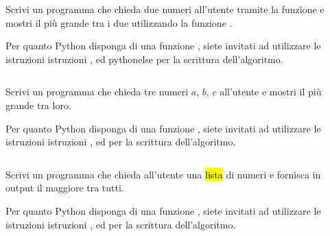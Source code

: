 \documentclass[a4paper,11pt,addpoints]{exam}
\begin{document}
\begin{questions}
    \question[3]  Scrivi un programma che chieda due numeri all'utente tramite la
    funzione  e mostri il più grande tra i due utilizzando la funzione .

    \begin{important}
        \item Per quanto Python disponga di una funzione , siete invitati ad utilizzare
        le istruzioni istruzioni ,  ed python{else} per la scrittura dell'algoritmo.
    \end{important}

    \begin{solution}
        \small\inputminted{python}{solution/001.py}
    \end{solution}

    \questionspace

    \question[9]  Scrivi un programma che chieda tre numeri $a$, $b$, $c$
    all'utente e mostri il più grande tra loro.

    \begin{important}
        \item Per quanto Python disponga di una funzione , siete invitati ad utilizzare
        le istruzioni istruzioni ,  ed  per la scrittura dell'algoritmo.
    \end{important}

    \begin{solution}
        \small\inputminted{python}{solution/002.py}
    \end{solution}

    \questionspace

    \question[3]  Scrivi un programma che chieda all'utente una \hl{lista}
    di numeri e fornisca in output il maggiore tra tutti.

    \begin{important}
        \item Per quanto Python disponga di una funzione , siete invitati ad utilizzare
        le istruzioni istruzioni ,  ed  per la scrittura dell'algoritmo.
    \end{important}

    \begin{solution}
        \small\inputminted{python}{solution/003.py}
    \end{solution}


\end{questions}
\end{document}
